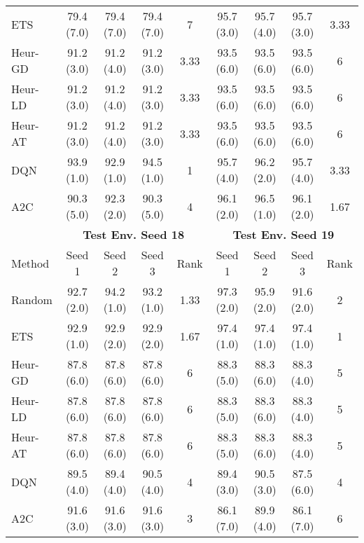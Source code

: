 \begin{table}[t]
{\begin{tabular}{lcccccccc}
ETS        & 79.4 (7.0) & 79.4 (7.0) & 79.4 (7.0) & 7    & 95.7 (3.0) & 95.7 (4.0) & 95.7 (3.0) & 3.33 \\
Heur-GD & 91.2 (3.0) & 91.2 (4.0) & 91.2 (3.0) & 3.33 & 93.5 (6.0) & 93.5 (6.0) & 93.5 (6.0) & 6    \\
Heur-LD & 91.2 (3.0) & 91.2 (4.0) & 91.2 (3.0) & 3.33 & 93.5 (6.0) & 93.5 (6.0) & 93.5 (6.0) & 6    \\
Heur-AT & 91.2 (3.0) & 91.2 (4.0) & 91.2 (3.0) & 3.33 & 93.5 (6.0) & 93.5 (6.0) & 93.5 (6.0) & 6    \\
DQN        & 93.9 (1.0) & 92.9 (1.0) & 94.5 (1.0) & 1    & 95.7 (4.0) & 96.2 (2.0) & 95.7 (4.0) & 3.33 \\
A2C        & 90.3 (5.0) & 92.3 (2.0) & 90.3 (5.0) & 4    & 96.1 (2.0) & 96.5 (1.0) & 96.1 (2.0) & 1.67 \\ \midrule
    & \multicolumn{4}{c}{{\bf Test Env. Seed 18}}             & \multicolumn{4}{c}{{\bf Test Env. Seed 19}} \\
    \cmidrule(lr){2-5} \cmidrule(lr){6-9} 
Method     & Seed 1     & Seed 2     & Seed 3     & Rank & Seed 1     & Seed 2     & Seed 3     & Rank \\ \midrule
Random     & 92.7 (2.0) & 94.2 (1.0) & 93.2 (1.0) & 1.33 & 97.3 (2.0) & 95.9 (2.0) & 91.6 (2.0) & 2    \\
ETS        & 92.9 (1.0) & 92.9 (2.0) & 92.9 (2.0) & 1.67 & 97.4 (1.0) & 97.4 (1.0) & 97.4 (1.0) & 1    \\
Heur-GD & 87.8 (6.0) & 87.8 (6.0) & 87.8 (6.0) & 6    & 88.3 (5.0) & 88.3 (6.0) & 88.3 (4.0) & 5    \\
Heur-LD & 87.8 (6.0) & 87.8 (6.0) & 87.8 (6.0) & 6    & 88.3 (5.0) & 88.3 (6.0) & 88.3 (4.0) & 5    \\
Heur-AT & 87.8 (6.0) & 87.8 (6.0) & 87.8 (6.0) & 6    & 88.3 (5.0) & 88.3 (6.0) & 88.3 (4.0) & 5    \\
DQN        & 89.5 (4.0) & 89.4 (4.0) & 90.5 (4.0) & 4    & 89.4 (3.0) & 90.5 (3.0) & 87.5 (6.0) & 4    \\
A2C        & 91.6 (3.0) & 91.6 (3.0) & 91.6 (3.0) & 3    & 86.1 (7.0) & 89.9 (4.0) & 86.1 (7.0) & 6   \\ 
\bottomrule
\end{tabular}
}
\end{table}